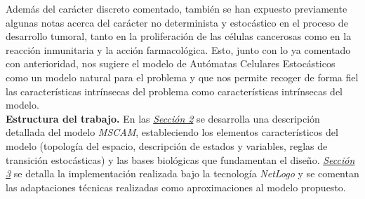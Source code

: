 Además del carácter discreto comentado, también se han expuesto previamente algunas notas acerca del carácter no determinista y estocástico en el proceso de desarrollo tumoral, tanto en la proliferación de las células cancerosas como en la reacción inmunitaria y la acción farmacológica. Esto, junto con lo ya comentado con anterioridad, nos sugiere el modelo de Autómatas Celulares Estocásticos \cite{Dobrushin1978} como un modelo natural para el problema y que nos permite recoger de forma fiel las características intrínsecas del problema como características intrínsecas del modelo.\\

\textbf{Estructura del trabajo.} En las \hyperref[sec:model]{\textit{Sección 2}} se desarrolla una descripción detallada del modelo \textit{MSCAM}, estableciendo los elementos característicos del modelo (topología del espacio, descripción de estados y variables, reglas de transición estocásticas) y las bases biológicas que fundamentan el diseño. \hyperref[sec:impl]{\textit{Sección 3}} se detalla la implementación realizada bajo la tecnología \textit{NetLogo} y se comentan las adaptaciones técnicas realizadas como aproximaciones al modelo propuesto. 



